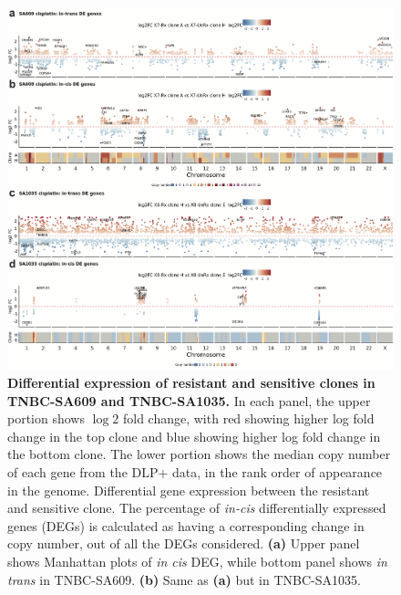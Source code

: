 \begin{figure}
\centering
  \includegraphics[width=\textwidth]{Figures/chap5/trackplotsSA609SA1035.png}
\caption[DE of resistant and sensitive clonealign defined clones]
	{\small
	\textbf{Differential expression of resistant and sensitive clones in TNBC-SA609 and TNBC-SA1035.}
 In each panel, the upper portion shows $\log 2$ fold change, with red showing higher log fold change in the top clone and blue showing higher log fold change in the bottom clone. The lower portion shows the median copy number of each gene from the DLP+ data, in the rank order of appearance in the genome.  Differential gene expression between the resistant and sensitive clone. The percentage of \textit{in-cis} differentially expressed genes (DEGs) is calculated as having a corresponding change in copy number, out of all the DEGs considered. 
 \textbf{(a)} Upper panel shows Manhattan plots of \textit{in cis} DEG, while bottom panel shows \textit{in trans} in TNBC-SA609.
 \textbf{(b)} Same as \textbf{(a)} but in TNBC-SA1035.
}
	\label{fig:trackplotsSA609SA1035}
 \end{figure}

